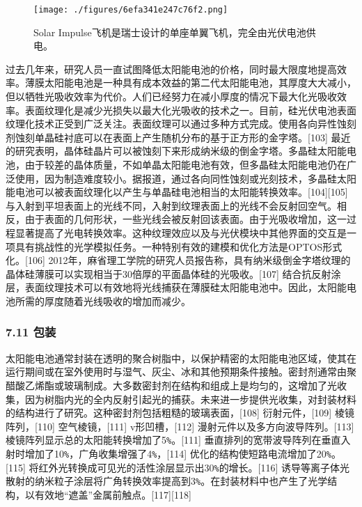 \begin{figure}[ht]
\centering
\texttt{[image: ./figures/6efa341e247c76f2.png]}
\caption{Solar Impulse飞机是瑞士设计的单座单翼飞机，完全由光伏电池供电。} \label{fig_TYNDC_4}
\end{figure}

过去几年来，研究人员一直试图降低太阳能电池的价格，同时最大限度地提高效率。薄膜太阳能电池是一种具有成本效益的第二代太阳能电池，其厚度大大减小，但以牺牲光吸收效率为代价。人们已经努力在减小厚度的情况下最大化光吸收效率。表面纹理化是减少光损失以最大化光吸收的技术之一。目前，硅光伏电池表面纹理化技术正受到广泛关注。表面纹理可以通过多种方式完成。使用各向异性蚀刻剂蚀刻单晶硅衬底可以在表面上产生随机分布的基于正方形的金字塔。[103] 最近的研究表明，晶体硅晶片可以被蚀刻下来形成纳米级的倒金字塔。多晶硅太阳能电池，由于较差的晶体质量，不如单晶太阳能电池有效，但多晶硅太阳能电池仍在广泛使用，因为制造难度较小。据报道，通过各向同性蚀刻或光刻技术，多晶硅太阳能电池可以被表面纹理化以产生与单晶硅电池相当的太阳能转换效率。[104][105] 与入射到平坦表面上的光线不同，入射到纹理表面上的光线不会反射回空气。相反，由于表面的几何形状，一些光线会被反射回该表面。由于光吸收增加，这一过程显著提高了光电转换效率。这种纹理效应以及与光伏模块中其他界面的交互是一项具有挑战性的光学模拟任务。一种特别有效的建模和优化方法是OPTOS形式化。[106] 2012年，麻省理工学院的研究人员报告称，具有纳米级倒金字塔纹理的晶体硅薄膜可以实现相当于30倍厚的平面晶体硅的光吸收。[107] 结合抗反射涂层，表面纹理技术可以有效地将光线捕获在薄膜硅太阳能电池中。因此，太阳能电池所需的厚度随着光线吸收的增加而减少。

\subsubsection{7.11 包装}

太阳能电池通常封装在透明的聚合树脂中，以保护精密的太阳能电池区域，使其在运行期间或在室外使用时与湿气、灰尘、冰和其他预期条件接触。密封剂通常由聚醋酸乙烯酯或玻璃制成。大多数密封剂在结构和组成上是均匀的，这增加了光收集，因为树脂内光的全内反射引起光的捕获。未来进一步提供光收集，对封装材料的结构进行了研究。这种密封剂包括粗糙的玻璃表面，[108] 衍射元件，[109] 棱镜阵列，[110] 空气棱镜，[111] v形凹槽，[112] 漫射元件以及多方向波导阵列。[113] 棱镜阵列显示总的太阳能转换增加了5\verb`%`。[111] 垂直排列的宽带波导阵列在垂直入射时增加了10\verb`%`，广角收集增强了4\verb`%`，[114] 优化的结构使短路电流增加了20\verb`%`。[115] 将红外光转换成可见光的活性涂层显示出30\verb`%`的增长。[116] 诱导等离子体光散射的纳米粒子涂层将广角转换效率提高到3\verb`%`。在封装材料中也产生了光学结构，以有效地“遮盖”金属前触点。[117][118]

